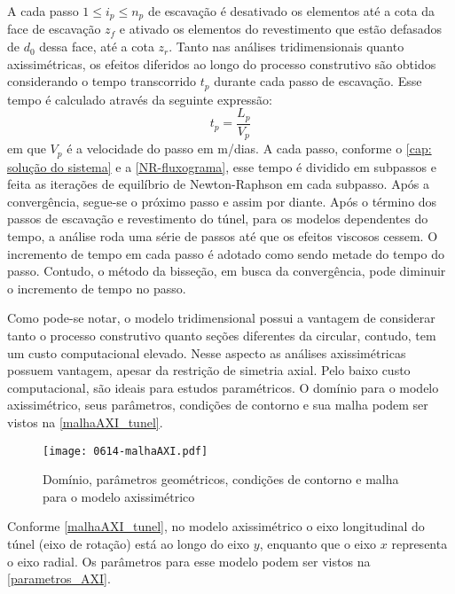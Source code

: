 A cada passo $1 \leq i_p \leq n_p$ de escavação é desativado os elementos até a cota da face de escavação $z_f$ e ativado os elementos do revestimento que estão defasados de $d_0$ dessa face, até a cota $z_r$. Tanto nas análises tridimensionais quanto axissimétricas, os efeitos diferidos ao longo do processo construtivo são obtidos considerando o tempo transcorrido $t_p$ durante cada passo de escavação. Esse tempo é calculado através da seguinte expressão:
\begin{equation}
	\label{eq:tp}
	t_p = \dfrac{L_p}{V_p}
\end{equation}
em que $V_p$ é a velocidade do passo em m/dias. A cada passo, conforme o \autoref{cap: solução do sistema} e a \autoref{NR-fluxograma}, esse tempo é dividido em subpassos e feita as iterações de equilíbrio de Newton-Raphson em cada subpasso. Após a convergência, segue-se o próximo passo e assim por diante. Após o término dos passos de escavação e revestimento do túnel, para os modelos dependentes do tempo, a análise roda uma série de passos até que os efeitos viscosos cessem. O incremento de tempo em cada passo é adotado como sendo metade do tempo do passo. Contudo, o método da bisseção, em busca da convergência, pode diminuir o incremento de tempo no passo.

Como pode-se notar, o modelo tridimensional possui a vantagem de considerar tanto o processo construtivo quanto seções diferentes da circular, contudo, tem um custo computacional elevado. Nesse aspecto as análises axissimétricas possuem vantagem, apesar da restrição de simetria axial. Pelo baixo custo computacional, são ideais para estudos paramétricos. O domínio para o modelo axissimétrico, seus parâmetros, condições de contorno e sua malha podem ser vistos na \autoref{malhaAXI_tunel}.

\begin{figure}[H]
	\begin{center}
		\texttt{[image: 0614-malhaAXI.pdf]}
	\end{center}
	\caption{\label{malhaAXI_tunel}Domínio, parâmetros geométricos, condições de contorno e malha para o modelo axissimétrico}
\end{figure}

Conforme \autoref{malhaAXI_tunel}, no modelo axissimétrico o eixo longitudinal do túnel (eixo de rotação) está ao longo do eixo $y$, enquanto que o eixo $x$ representa o eixo radial. Os parâmetros para esse modelo podem ser vistos na \autoref{parametros_AXI}.

